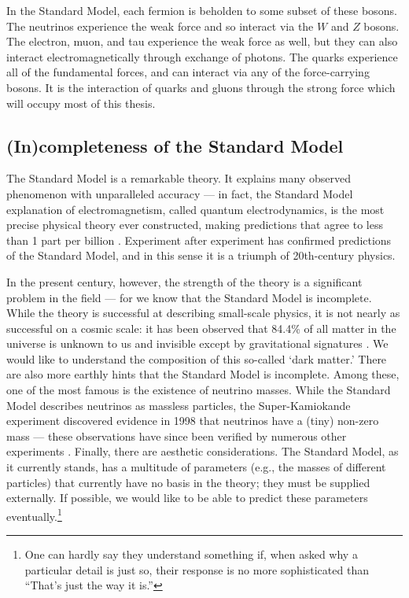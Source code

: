 \documentclass[../thesis.tex]{subfiles}
\begin{document}
	In the Standard Model, each fermion is beholden to some subset of these bosons. The neutrinos experience the weak force and so interact via the $W$ and $Z$ bosons. The electron, muon, and tau experience the weak force as well, but they can also interact electromagnetically through exchange of photons. The quarks experience all of the fundamental forces, and can interact via any of the force-carrying bosons. It is the interaction of quarks and gluons through the strong force which will occupy most of this thesis.


\subsection{(In)completeness of the Standard Model}
	The Standard Model is a remarkable theory. It explains many observed phenomenon with unparalleled accuracy --- in fact, the Standard Model explanation of electromagnetism, called quantum electrodynamics, is the most precise physical theory ever constructed, making predictions that agree to less than 1 part per billion \cite{larkoski_elementary_2019-1}. Experiment after experiment has confirmed predictions of the Standard Model, and in this sense it is a triumph of 20th-century physics.

	In the present century, however, the strength of the theory is a significant problem in the field --- for we know that the Standard Model is incomplete. While the theory is successful at describing small-scale physics, it is not nearly as successful on a cosmic scale: it has been observed that 84.4\% of all matter in the universe is unknown to us and invisible except by gravitational signatures \cite{particle_data_group_review_2020}. We would like to understand the composition of this so-called `dark matter.' There are also more earthly hints that the Standard Model is incomplete. Among these, one of the most famous is the existence of neutrino masses. While the Standard Model describes neutrinos as massless particles, the Super-Kamiokande experiment discovered evidence in 1998 that neutrinos have a (tiny) non-zero mass \cite{super-kamiokande_collaboration_evidence_1998} --- these observations have since been verified by numerous other experiments \cite{particle_data_group_review_2020}. Finally, there are aesthetic considerations. The Standard Model, as it currently stands, has a multitude of parameters (e.g., the masses of different particles) that currently have no basis in the theory; they must be supplied externally. If possible, we would like to be able to predict these parameters eventually.\footnote{One can hardly say they understand something if, when asked why a particular detail is just so, their response is no more sophisticated than ``That's just the way it is.''}
\end{document}
